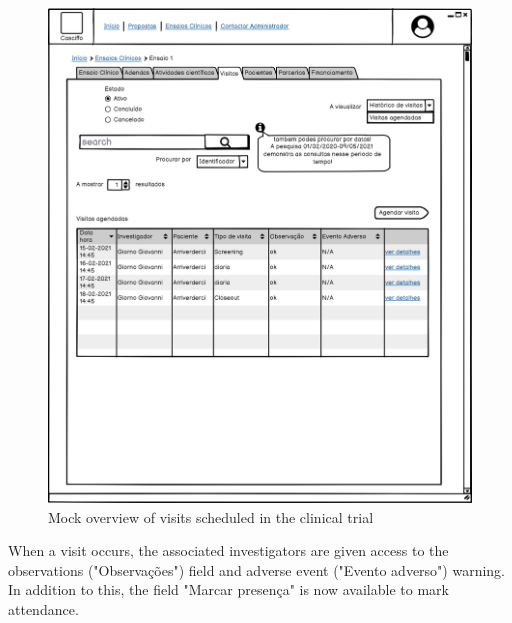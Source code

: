\begin{figure}[H]
    \centering
    \includegraphics[scale=0.35]{images/ensaio-visitas.png}
    \caption{Mock overview of visits scheduled in the clinical trial}
    \label{fig:ensaio-visitas}
\end{figure}

When a visit occurs, the associated investigators are given access to the observations ("Observações") field and adverse event ("Evento adverso") warning. In addition to this, the field "Marcar presença" is now available to mark attendance.